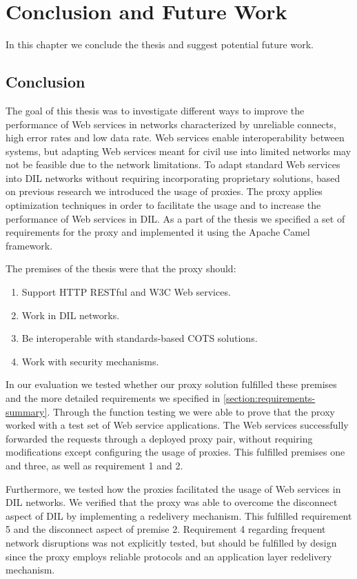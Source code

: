 \chapter{Conclusion and Future Work}
\label{chapter:conclusion}

In this chapter we conclude the thesis and suggest potential future work.

\section{Conclusion}

The goal of this thesis was to investigate different ways to improve the
performance of Web services in networks characterized by unreliable connects,
high error rates and low data rate. Web services enable interoperability between
systems, but adapting Web services meant for civil use into limited networks may
not be feasible due to the network limitations. To adapt standard Web services
into DIL networks without requiring incorporating proprietary solutions, based
on previous research we introduced the usage of proxies. The proxy applies
optimization techniques in order to facilitate the usage and to increase the
performance of Web services in DIL. As a part of the thesis we specified a set
of requirements for the proxy and implemented it using the Apache Camel
framework.

The premises of the thesis were that the proxy should:

\begin{enumerate}
    \item Support HTTP RESTful and W3C Web services.
    \item Work in DIL networks.
    \item Be interoperable with standards-based COTS solutions.
    \item Work with security mechanisms.
\end{enumerate}

In our evaluation we tested whether our proxy solution fulfilled these premises
and the more detailed requirements we specified in
\cref{section:requirements-summary}. Through the function testing we were able
to prove that the proxy worked with a test set of Web service applications. The
Web services successfully forwarded the requests through a deployed proxy pair,
without requiring modifications except configuring the usage of proxies. This
fulfilled premises one and three, as well as requirement 1 and 2.

Furthermore, we tested how the proxies facilitated the usage of Web services in
DIL networks. We verified that the proxy was able to overcome the disconnect
aspect of DIL by implementing a redelivery mechanism. This fulfilled requirement
5 and the disconnect aspect of premise 2. Requirement 4 regarding frequent
network disruptions was not explicitly tested, but should be fulfilled by design
since the proxy employs reliable protocols and an application layer redelivery
mechanism.

